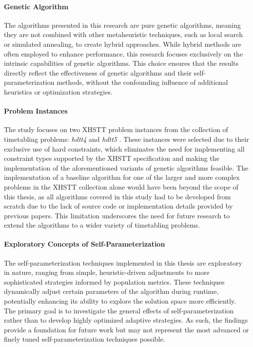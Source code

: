 \documentclass[english,examples]{isasthesis}
\begin{document}
\paragraph{Genetic Algorithm}
The algorithms presented in this research are pure genetic algorithms, meaning
they are not combined with other metaheuristic techniques, such as local
search or simulated annealing, to create hybrid approaches. While hybrid
methods are often employed to enhance performance, this research focuses
exclusively on the intrinsic capabilities of genetic algorithms. This choice
ensures that the results directly reflect the effectiveness of genetic
algorithms and their self-parameterization methods, without the confounding
influence of additional heuristics or optimization strategies.

\paragraph{Problem Instances}
The study focuses on two XHSTT problem instances from the collection of
timetabling problems: \textit{hdtt4} and \textit{hdtt5}
\cite{xhstt2014-artificial,hdtt4,hdtt5}. These
instances were selected due to their exclusive use of hard constraints, which
eliminates the need for implementing all constraint types supported by the
XHSTT specification and making the implementation of the aforementioned
variants of genetic algorithms feasible.
The implementation of a baseline algorithm for one of the larger and more
complex problems in the XHSTT collection alone would have been beyond the scope
of this thesis, as all algorithms covered in this study had to be developed
from scratch due to the lack of source code or implementation details provided
by previous papers.
%
This limitation underscores the need for future research to extend the
algorithms to a wider variety of timetabling problems.

\paragraph{Exploratory Concepts of Self-Parameterization}
The self-parameterization techniques implemented in this thesis are exploratory
in nature, ranging from simple, heuristic-driven adjustments to more
sophisticated strategies informed by population metrics.
%
These techniques dynamically
adjust certain parameters of the algorithm during runtime, potentially enhancing
its ability to explore the solution space more efficiently.
%
The primary goal is to
investigate the general effects of self-parameterization rather than to develop
highly optimized adaptive strategies. As such, the findings provide a foundation
for future work but may not represent the most advanced or finely tuned
self-parameterization techniques possible.
\end{document}
